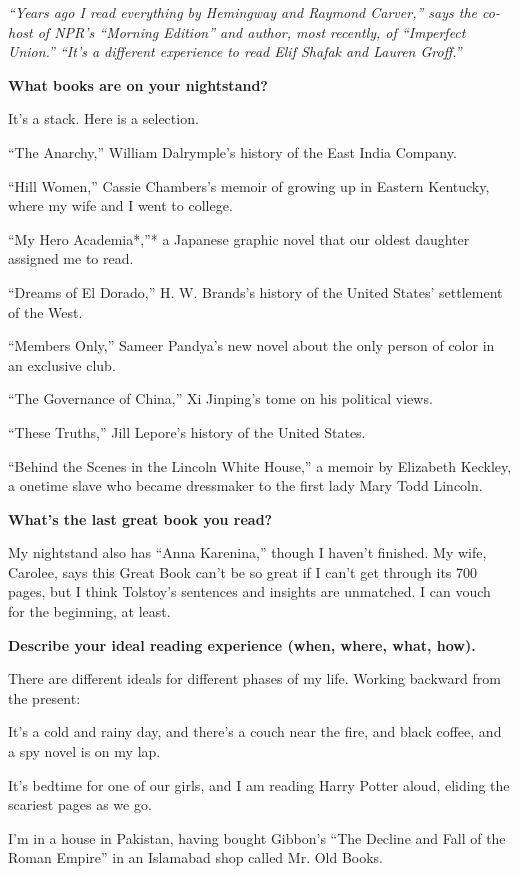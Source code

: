 \emph{``Years ago I read everything by Hemingway and Raymond Carver,''
says the co-host of NPR's ``Morning Edition'' and author, most recently,
of ``Imperfect Union.'' ``It's a different experience to read Elif
Shafak and Lauren Groff.''}

\textbf{What books are on your nightstand?}

It's a stack. Here is a selection.

``The Anarchy,'' William Dalrymple's history of the East India Company.

``Hill Women,'' Cassie Chambers's memoir of growing up in Eastern
Kentucky, where my wife and I went to college.

``My Hero Academia*,''* a Japanese graphic novel that our oldest
daughter assigned me to read.

``Dreams of El Dorado,'' H. W. Brands's history of the United States'
settlement of the West.

``Members Only,'' Sameer Pandya's new novel about the only person of
color in an exclusive club.

``The Governance of China,'' Xi Jinping's tome on his political views.

``These Truths,'' Jill Lepore's history of the United States.

``Behind the Scenes in the Lincoln White House,'' a memoir by Elizabeth
Keckley, a onetime slave who became dressmaker to the first lady Mary
Todd Lincoln.

\textbf{What's the last great book you read?}

My nightstand also has ``Anna Karenina,'' though I haven't finished. My
wife, Carolee, says this Great Book can't be so great if I can't get
through its 700 pages, but I think Tolstoy's sentences and insights are
unmatched. I can vouch for the beginning, at least.

\textbf{Describe your ideal reading experience (when, where, what,
how).}

There are different ideals for different phases of my life. Working
backward from the present:

It's a cold and rainy day, and there's a couch near the fire, and black
coffee, and a spy novel is on my lap.

It's bedtime for one of our girls, and I am reading Harry Potter aloud,
eliding the scariest pages as we go.

I'm in a house in Pakistan, having bought Gibbon's ``The Decline and
Fall of the Roman Empire'' in an Islamabad shop called Mr. Old Books.

